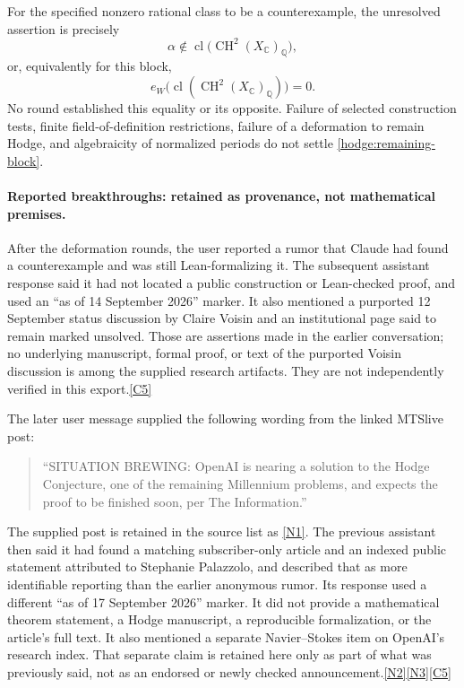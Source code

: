 \documentclass[11pt]{article}
\newcommand{\Q}{\mathbb Q}
\newcommand{\C}{\mathbb C}
\newcommand{\cl}{\operatorname{cl}}
\newcommand{\CH}{\operatorname{CH}}
\newcommand{\src}[1]{\hyperlink{src:#1}{[#1]}}
\begin{document}
For the specified nonzero rational class to be a counterexample, the
unresolved assertion is precisely
\begin{equation}\label{hodge:remaining-alpha}
 \alpha\notin\cl\bigl(\CH^2(X_{\C})_{\Q}\bigr),
\end{equation}
or, equivalently for this block,
\begin{equation}\label{hodge:remaining-block}
 \boxed{\quad e_W\bigl(\cl(\CH^2(X_{\C})_{\Q})\bigr)=0.\quad}
\end{equation}
No round established this equality or its opposite. Failure of selected
construction tests, finite field-of-definition restrictions, failure of a
deformation to remain Hodge, and algebraicity of normalized periods do not
settle \eqref{hodge:remaining-block}.

\paragraph{Reported breakthroughs: retained as provenance, not mathematical premises.}
After the deformation rounds, the user reported a rumor that Claude had
found a counterexample and was still Lean-formalizing it. The subsequent
assistant response said it had not located a public construction or
Lean-checked proof, and used an ``as of 14 September 2026'' marker. It also
mentioned a purported 12 September status discussion by Claire Voisin and
an institutional page said to remain marked unsolved. Those are assertions
made in the earlier conversation; no underlying manuscript, formal proof,
or text of the purported Voisin discussion is among the supplied research
artifacts. They are not independently verified in this export.\src{C5}

The later user message supplied the following wording from the linked
MTSlive post:
\begin{quote}
``SITUATION BREWING: OpenAI is nearing a solution to the Hodge Conjecture,
one of the remaining Millennium problems, and expects the proof to be
finished soon, per The Information.''
\end{quote}
The supplied post is retained in the source list as \src{N1}. The previous
assistant then said it had found a matching subscriber-only article and an
indexed public statement attributed to Stephanie Palazzolo, and described
that as more identifiable reporting than the earlier anonymous rumor. Its
response used a different ``as of 17 September 2026'' marker. It did not
provide a mathematical theorem statement, a Hodge manuscript, a reproducible
formalization, or the article's full text. It also mentioned a separate
Navier--Stokes item on OpenAI's research index. That separate claim is
retained here only as part of what was previously said, not as an endorsed
or newly checked announcement.\src{N2}\src{N3}\src{C5}
\end{document}
